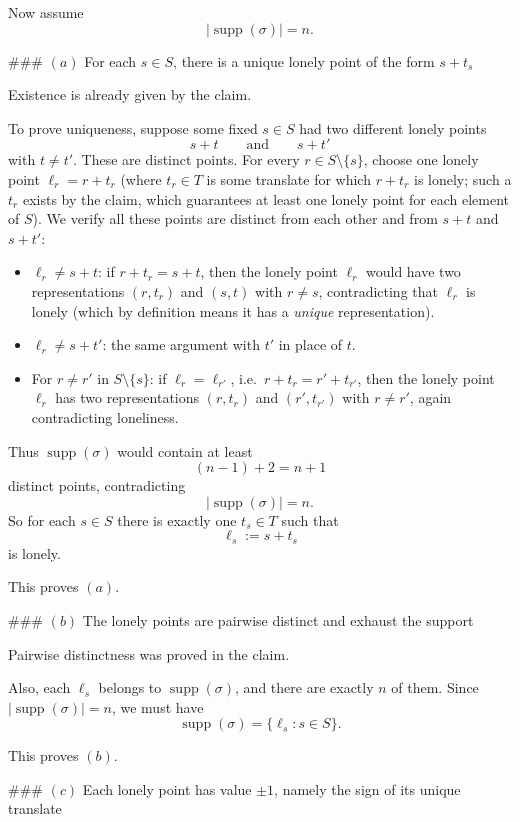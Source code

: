 Now assume
\[
|\operatorname{supp}(\sigma)|=n.
\]

### \((a)\) For each \(s\in S\), there is a unique lonely point of the form \(s+t_s\)

Existence is already given by the claim.

To prove uniqueness, suppose some fixed \(s\in S\) had two different lonely points
\[
s+t
\qquad\text{and}\qquad
s+t'
\]
with \(t\neq t'\). These are distinct points. For every \(r\in S\setminus\{s\}\), choose one lonely point \(\ell_r=r+t_r\) (where \(t_r\in T\) is some translate for which \(r+t_r\) is lonely; such a \(t_r\) exists by the claim, which guarantees at least one lonely point for each element of \(S\)). We verify all these points are distinct from each other and from \(s+t\) and \(s+t'\):
\begin{itemize}
\item \(\ell_r\neq s+t\): if \(r+t_r=s+t\), then the lonely point \(\ell_r\) would have two representations \((r,t_r)\) and \((s,t)\) with \(r\neq s\), contradicting that \(\ell_r\) is lonely (which by definition means it has a \emph{unique} representation).
\item \(\ell_r\neq s+t'\): the same argument with \(t'\) in place of \(t\).
\item For \(r\neq r'\) in \(S\setminus\{s\}\): if \(\ell_r=\ell_{r'}\), i.e.\ \(r+t_r=r'+t_{r'}\), then the lonely point \(\ell_r\) has two representations \((r,t_r)\) and \((r',t_{r'})\) with \(r\neq r'\), again contradicting loneliness.
\end{itemize} Thus \(\operatorname{supp}(\sigma)\) would contain at least
\[
(n-1)+2=n+1
\]
distinct points, contradicting
\[
|\operatorname{supp}(\sigma)|=n.
\]
So for each \(s\in S\) there is exactly one \(t_s\in T\) such that
\[
\ell_s:=s+t_s
\]
is lonely.

This proves \((a)\).

### \((b)\) The lonely points are pairwise distinct and exhaust the support

Pairwise distinctness was proved in the claim.

Also, each \(\ell_s\) belongs to \(\operatorname{supp}(\sigma)\), and there are exactly \(n\) of them. Since \(|\operatorname{supp}(\sigma)|=n\), we must have
\[
\operatorname{supp}(\sigma)=\{\ell_s:s\in S\}.
\]

This proves \((b)\).

### \((c)\) Each lonely point has value \(\pm 1\), namely the sign of its unique translate


